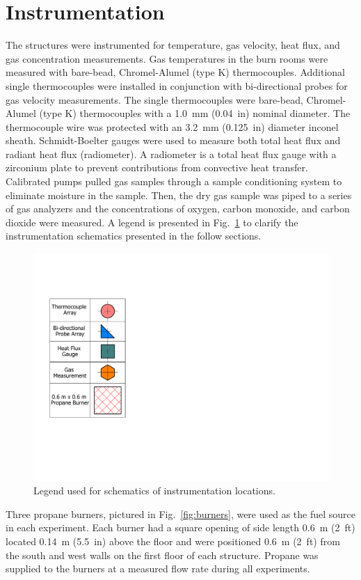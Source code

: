 \documentclass[12pt,oneside]{book}
\begin{document}
\section{Instrumentation}
\label{sec:Instrumentation}
The structures were instrumented for temperature, gas velocity, heat flux, and gas concentration measurements. Gas temperatures in the burn rooms were measured with bare-bead, Chromel-Alumel (type K) thermocouples. Additional single thermocouples were installed in conjunction with bi-directional probes for gas velocity measurements. The single thermocouples were bare-bead, Chromel-Alumel (type K) thermocouples with a 1.0~mm (0.04~in) nominal diameter. The thermocouple wire was protected with an 3.2~mm (0.125~in) diameter inconel sheath. Schmidt-Boelter gauges were used to measure both total heat flux and radiant heat flux (radiometer). A radiometer is a total heat flux gauge with a zirconium plate to prevent contributions from convective heat transfer. Calibrated pumps pulled gas samples through a sample conditioning system to eliminate moisture in the sample. Then, the dry gas sample was piped to a series of gas analyzers and the concentrations of oxygen, carbon monoxide, and carbon dioxide were measured. A legend is presented in Fig.~\ref{fig:Instrumentation_Legend} to clarify the instrumentation schematics presented in the follow sections.

\begin{figure}[!ht]
	\includegraphics[width=0.25\columnwidth]{../Figures/Floor_Plans/Instrumentation_Legend}
	\caption[Instrumentation legend.]{Legend used for schematics of instrumentation locations.}
	\label{fig:Instrumentation_Legend}
\end{figure}

Three propane burners, pictured in Fig.~\ref{fig:burners}, were used as the fuel source in each experiment. Each burner had a square opening of side length 0.6~m (2~ft) located 0.14~m (5.5~in) above the floor and were positioned 0.6~m (2~ft) from the south and west walls on the first floor of each structure. Propane was supplied to the burners at a measured flow rate during all experiments.
\end{document}
